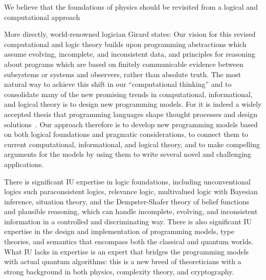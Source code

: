 \documentclass{article}
\theoremstyle{remark}
\begin{document}
We believe that the foundations of physics should be revisited from a
logical and computational approach

More directly, world-renowned logician Girard states:
Our vision for this revised computational and logic theory builds upon
programming abstractions which assume evolving, incomplete, and
inconsistent data, and principles for reasoning about programs which
are based on finitely communicable evidence between subsystems or
systems and observers, rather than absolute truth. The most natural
way to achieve this shift in our ``computational thinking'' and to
consolidate many of the new promising trends in computational,
informational, and logical theory is to design new programming
models. For it is indeed a widely accepted thesis that programming
languages shape thought processes and design
solutions~\cite{iverson80,johansen-berg01}. Our approach therefore is
to develop new programming models based on both logical foundations
and pragmatic considerations, to connect them to current
computational, informational, and logical theory, and to make
compelling arguments for the models by using them to write several
novel and challenging applications.

There is significant IU expertise in logic foundations, including
unconventional logics such paraconsistent logics, relevance logic,
multivalued logic with Bayesian inference, situation theory, and the
Dempster-Shafer theory of belief functions and plausible reasoning,
which can handle incomplete, evolving, and inconsistent information in
a controlled and discriminating way. There is also significant IU
expertise in the design and implementation of programming models, type
theories, and semantics that encompass both the classical and quantum
worlds. What IU lacks in expertise is an expert that bridges the
programming models with actual quantum algorithms: this is a new breed
of theoreticians with a strong background in both physics, complexity
theory, and cryptography.
\end{document}
